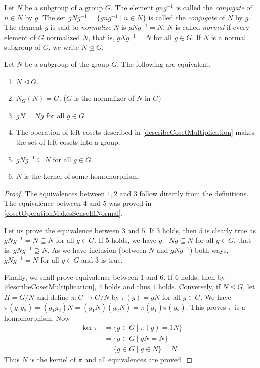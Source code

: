 \begin{definition}
\label{defineNormal}
    Let $N$ be a subgroup of a group $G$. The element $gng^{-1}$ is called the \textit{conjugate} of $n\in N$ by $g$. The set $gNg^{-1}=\{gng^{-1}\mid n\in N\}$ is called the \textit{conjugate} of $N$ by $g$. The element $g$ is said to \textit{normalize} $N$ is $gNg^{-1}=N$. $N$ is called \textit{normal} if every element of $G$ normalized $N$, that is, $gNg^{-1}=N$ for all $g\in G$. If $N$ is a normal subgroup of $G$, we write $N\unlhd G$.
\end{definition}

\begin{theorem}
\label{normalSubgroupEquivalences}
    Let $N$ be a subgroup of the group $G$. The following are equivalent.
    \begin{enumerate}
        \item $N\unlhd G$.
        \item $N_G(N)=G$. ($G$ is the normalizer of $N$ in $G$)
        \item $gN=Ng$ for all $g\in G$.
        \item The operation of left cosets described in \ref{describeCosetMultiplication} makes the set of left cosets into a group.
        \item $gNg^{-1}\subseteq N$ for all $g\in G$.
        \item $N$ is the kernel of some homomorphism.
    \end{enumerate}
\end{theorem}
\begin{proof}
    The equivalences between $1, 2$ and $3$ follow directly from the definitions. The equivalence between $4$ and $5$ was proved in \ref{cosetOperationMakesSenseIffNormal}.
    
    Let us prove the equivalence between $3$ and $5$. If $3$ holds, then $5$ is clearly true as $gNg^{-1}=N\subseteq N$ for all $g\in G$. If $5$ holds, we have $g^{-1}Ng\subseteq N$ for all $g\in G$, that is, $gNg^{-1}\supseteq N$. As we have inclusion (between $N$ and $gNg^{-1}$) both ways, $gNg^{-1}=N$ for all $g\in G$ and $3$ is true.
    
    \vspace{1mm}
    Finally, we shall prove equivalence between $1$ and $6$. If $6$ holds, then by \ref{describeCosetMultiplication}, $4$ holds and thus $1$ holds. Conversely, if $N\unlhd G$, let $H=G/N$ and define $\pi:G\to G/N$ by $\pi(g)=gN$ for all $g\in G$. We have $\pi(g_1g_2)=(g_1g_2)N=(g_1N)(g_2N)=\pi(g_1)\pi(g_2)$. This proves $\pi$ is a homomorphism. Now
    \begin{align*}
        \ker\pi &= \{g\in G\mid \pi(g)=1N\} \\
                    &= \{g\in G\mid gN=N\} \\
                    &= \{g\in G\mid g\in N\}=N
    \end{align*}
    Thus $N$ is the kernel of $\pi$ and all equivalences are proved.
\end{proof}

